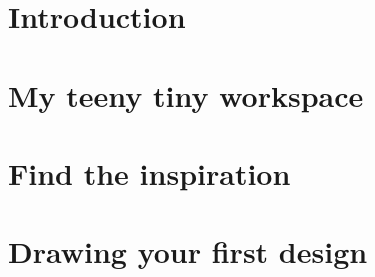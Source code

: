 \chapter{Introduction} \label{chap:intro}


\chapter{My teeny tiny workspace} \label{chap:workspace}


\chapter{Find the inspiration} \label{chap:inspiration}


\chapter{Drawing your first design} \label{chap:design}


